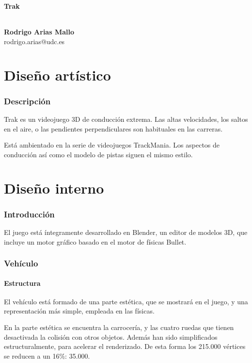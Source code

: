 \documentclass[10pt,a4paper,hidelinks]{article}
\begin{document}
\begin{center}
\begin{huge}
\textbf{Trak}
\end{huge}
\\[10pt]
\textbf{Rodrigo Arias Mallo}\\
rodrigo.arias@udc.es
\end{center}

\part{Diseño artístico}
\section{Descripción}
Trak es un videojuego 3D de conducción extrema. Las altas velocidades, los 
saltos en el aire, o las pendientes perpendiculares son habituales en las 
carreras.

Está ambientado en la serie de videojuegos TrackMania. Los aspectos de 
conducción así como el modelo de pistas siguen el mismo estilo.

\part{Diseño interno}
\section{Introducción}
El juego está íntegramente desarrollado en Blender, un editor de modelos 3D, que 
incluye un motor gráfico basado en el motor de físicas Bullet.

\section{Vehículo}
\subsection{Estructura}
El vehículo está formado de una parte estética, que se mostrará en el juego, y 
una representación más simple, empleada en las físicas.

En la parte estética se encuentra la carrocería, y las cuatro ruedas que tienen 
desactivada la colisión con otros objetos. Además han sido simplificados 
estructuralmente, para acelerar el renderizado. De esta forma los 215.000 
vértices se reducen a un 16\%: 35.000.
\end{document}
